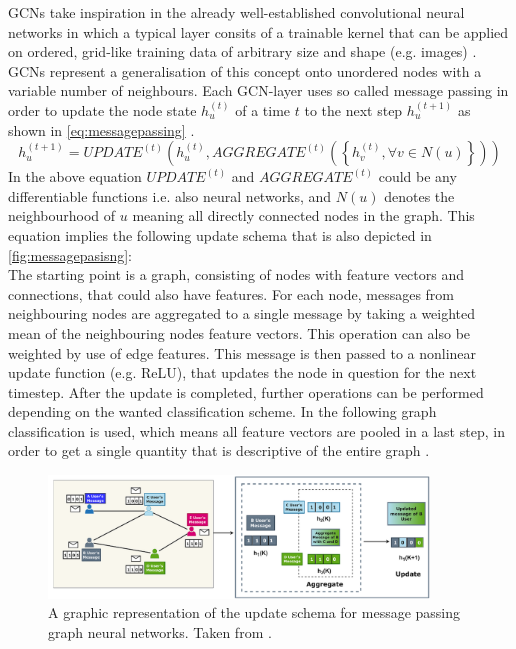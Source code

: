 \documentclass[11pt,a4paper]{article}
\begin{document}
GCNs take inspiration in the already well-established convolutional neural networks in which a typical layer consits of a trainable kernel that can be applied on ordered, grid-like training data of arbitrary size and shape (e.g. images) \cite{khemaniReviewGraphNeural2024}. 
GCNs represent a generalisation of this concept onto unordered nodes with a variable number of neighbours. 
Each GCN-layer uses so called message passing in order to update the node state $h^{(t)}_u$ of a time $t$ to the next step $h^{(t+1)}_u$ as shown in \autoref{eq:messagepassing} \cite[eq. 4.1]{khemaniReviewGraphNeural2024}.
\begin{equation}
    h^{(t+1)}_u = UPDATE^{(t)}\left(h^{(t)}_u, AGGREGATE^{(t)}\left(\left\{h^{(t)}_v, \forall v \in N(u)\right\}\right)\right)
    \label{eq:messagepassing}
\end{equation}
In the above equation $UPDATE^{(t)}$ and $AGGREGATE^{(t)}$ could be any differentiable functions i.e. also neural networks, and $N(u)$ denotes the neighbourhood of $u$ meaning all directly connected nodes in the graph. 
This equation implies the following update schema that is also depicted in \autoref{fig:messagepasisng}: \\
The starting point is a graph, consisting of nodes with feature vectors and connections, that could also have features. 
For each node, messages from neighbouring nodes are aggregated to a single message by taking a weighted mean of the neighbouring nodes feature vectors. 
This operation can also be weighted by use of edge features. 
This message is then passed to a nonlinear update function (e.g. ReLU), that updates the node in question for the next timestep. 
After the update is completed, further operations can be performed depending on the wanted classification scheme. 
In the following graph classification is used, which means all feature vectors are pooled in a last step, in order to get a single quantity that is descriptive of the entire graph \cite{khemaniReviewGraphNeural2024}.
\begin{figure}[htbp]
    \centering
    \includegraphics[width=0.9\textwidth]{images/khemani7.png}
    \caption{A graphic representation of the update schema for message passing graph neural networks. Taken from \cite[Fig. 7]{khemaniReviewGraphNeural2024}.}
    \label{fig:messagepasisng}
\end{figure}
\end{document}
